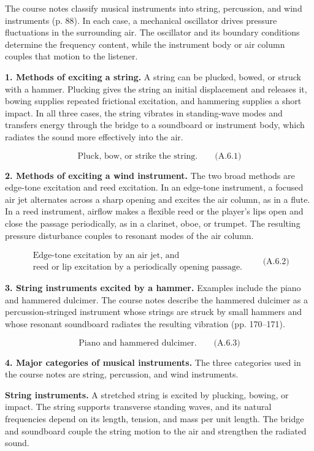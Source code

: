 The course notes classify musical instruments into string, percussion, and wind instruments (p. 88). In each case, a mechanical oscillator drives pressure fluctuations in the surrounding air. The oscillator and its boundary conditions determine the frequency content, while the instrument body or air column couples that motion to the listener.

\textbf{1. Methods of exciting a string.} A string can be plucked, bowed, or struck with a hammer. Plucking gives the string an initial displacement and releases it, bowing supplies repeated frictional excitation, and hammering supplies a short impact. In all three cases, the string vibrates in standing-wave modes and transfers energy through the bridge to a soundboard or instrument body, which radiates the sound more effectively into the air.

\[
\boxed{\text{Pluck, bow, or strike the string.}}\qquad\text{(A.6.1)}
\]

\textbf{2. Methods of exciting a wind instrument.} The two broad methods are edge-tone excitation and reed excitation. In an edge-tone instrument, a focused air jet alternates across a sharp opening and excites the air column, as in a flute. In a reed instrument, airflow makes a flexible reed or the player's lips open and close the passage periodically, as in a clarinet, oboe, or trumpet. The resulting pressure disturbance couples to resonant modes of the air column.

\[
\boxed{\begin{gathered}
\text{Edge-tone excitation by an air jet, and}\\
\text{reed or lip excitation by a periodically opening passage.}
\end{gathered}}\qquad\text{(A.6.2)}
\]

\textbf{3. String instruments excited by a hammer.} Examples include the piano and hammered dulcimer. The course notes describe the hammered dulcimer as a percussion-stringed instrument whose strings are struck by small hammers and whose resonant soundboard radiates the resulting vibration (pp. 170--171).

\[
\boxed{\text{Piano and hammered dulcimer.}}\qquad\text{(A.6.3)}
\]

\textbf{4. Major categories of musical instruments.} The three categories used in the course notes are string, percussion, and wind instruments.

\textbf{String instruments.} A stretched string is excited by plucking, bowing, or impact. The string supports transverse standing waves, and its natural frequencies depend on its length, tension, and mass per unit length. The bridge and soundboard couple the string motion to the air and strengthen the radiated sound.

